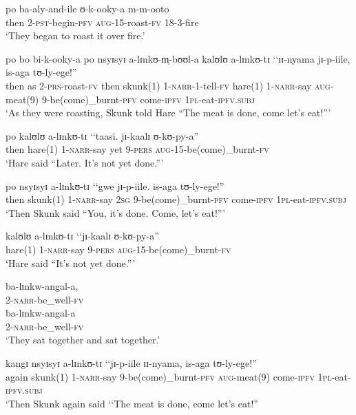 \begin{exe}
\ex \gll po ba-aly-and-ile ʊ-k-ooky-a m-m-ooto\\
then 2-\textsc{pst}-begin-\textsc{pfv} \textsc{aug}-15-roast-\textsc{fv} 18-3-fire\\
\glt \lq They began to roast it over fire.'

\ex \gll po bo bi-k-ooky-a po nsyɪsyɪ a-lɪnkʊ-m̩-bʊʊl-a kalʊlʊ a-lɪnkʊ-tɪ \lq\lq ɪɪ-nyama jɪ-p-iile, is-aga tʊ-ly-ege!''\\
then as 2-\textsc{prs}-roast-\textsc{fv} then skunk(1) 1-\textsc{narr}-1-tell-\textsc{fv} hare(1) 1-\textsc{narr}-say 
\phantom{\lq\lq}\textsc{aug}-meat(9) 9-be(come)\_burnt-\textsc{pfv} come-\textsc{ipfv} \textsc{1pl}-eat-\textsc{ipfv.subj}\\
\glt \lq As they were roasting, Skunk told Hare ``The meat is done, come let's eat!''{}'

\ex \gll po kalʊlʊ a-lɪnkʊ-tɪ \lq\lq taasi. jɪ-kaalɪ ʊ-kʊ-py-a''\\
then hare(1) 1-\textsc{narr}-say \phantom{\lq\lq}yet 9-\textsc{pers} \textsc{aug}-15-be(come)\_burnt-\textsc{fv}\\
\glt \lq  Hare said ``Later. It's not yet done.''{}'

\ex \gll po nsyɪsyɪ a-lɪnkʊ-tɪ \lq\lq gwe jɪ-p-iile. is-aga tʊ-ly-ege!''\\
then skunk(1) 1-\textsc{narr}-say \phantom{\lq\lq}\textsc{2sg} 9-be(come)\_burnt-\textsc{pfv} come-\textsc{ipfv} \textsc{1pl}-eat-\textsc{ipfv.subj}\\
\glt `Then Skunk said ``You, it's done. Come, let's eat!''{}'

\ex \gll kalʊlʊ a-lɪnkʊ-tɪ \lq\lq jɪ-kaalɪ ʊ-kʊ-py-a''\\
hare(1) 1-\textsc{narr}-say \phantom{\lq\lq}9-\textsc{pers} \textsc{aug}-15-be(come)\_burnt-\textsc{fv}\\
\glt \lq  Hare said ``It's not yet done.''{}'

\ex \gll ba-lɪnkw-angal-a,\\
2-\textsc{narr}-be\_well-\textsc{fv}\\

\ex \gll ba-lɪnkw-angal-a\\
2-\textsc{narr}-be\_well-\textsc{fv}\\
\glt \lq They sat together and sat together.'

\ex \gll kangɪ nsyɪsyɪ a-lɪnkʊ-tɪ \lq\lq jɪ-p-iile ɪɪ-nyama, is-aga tʊ-ly-ege!''\\
again skunk(1) 1-\textsc{narr}-say \phantom{\lq\lq}9-be(come)\_burnt-\textsc{pfv} \textsc{aug}-meat(9) come-\textsc{ipfv} \textsc{1pl}-eat-\textsc{ipfv.subj}\\
\glt \lq Then Skunk again said \lq\lq The meat is done, come let's eat!''


\end{exe}
